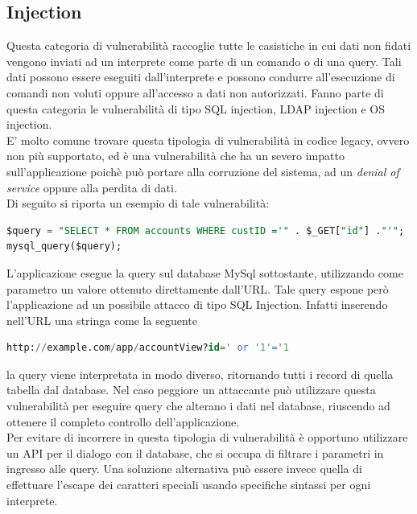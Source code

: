 \subsection{Injection}
Questa categoria di vulnerabilità raccoglie tutte le casistiche in cui dati non fidati vengono inviati ad un interprete come parte di un comando o di una query. Tali dati possono essere eseguiti dall'interprete e possono condurre all'esecuzione di comandi non voluti oppure all'accesso a dati non autorizzati. Fanno parte di questa categoria le vulnerabilità di tipo SQL injection, LDAP injection e OS injection.\\
E' molto comune trovare questa tipologia di vulnerabilità in codice legacy, ovvero non più supportato, ed è una vulnerabilità che ha un severo impatto sull'applicazione poichè può portare alla corruzione del sistema, ad un \emph{denial of service} oppure alla perdita di dati.\\
Di seguito si riporta un esempio di tale vulnerabilità:\\

\begin{lstlisting}[language=SQL]
$query = "SELECT * FROM accounts WHERE custID ='" . $_GET["id"] ."'";
mysql_query($query);
\end{lstlisting}

L'applicazione esegue la query sul database MySql sottostante, utilizzando come parametro un valore ottenuto direttamente dall'URL. Tale query espone però l'applicazione ad un possibile attacco di tipo SQL Injection. Infatti inserendo nell'URL una stringa come la seguente\\

\begin{lstlisting}[language=SQL]
http://example.com/app/accountView?id=' or '1'='1
\end{lstlisting}

la query viene interpretata in modo diverso, ritornando tutti i record di quella tabella dal database. Nel caso peggiore un attaccante può utilizzare questa vulnerabilità per eseguire query che alterano i dati nel database, riuscendo ad ottenere il completo controllo dell'applicazione. \\
Per evitare di incorrere in questa tipologia di vulnerabilità è opportuno utilizzare un API per il dialogo con il database, che si occupa di filtrare i parametri in ingresso alle query. Una soluzione alternativa può essere invece quella di effettuare l'escape dei caratteri speciali usando specifiche sintassi per ogni interprete.


